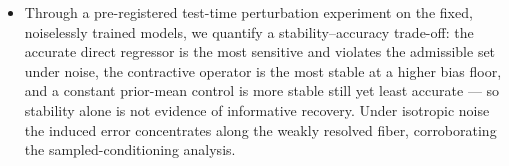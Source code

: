 \begin{itemize}
    \item Through a pre-registered test-time perturbation experiment on the fixed, noiselessly trained models, we quantify a stability--accuracy trade-off: the accurate direct regressor is the most sensitive and violates the admissible set under noise, the contractive operator is the most stable at a higher bias floor, and a constant prior-mean control is more stable still yet least accurate --- so stability alone is not evidence of informative recovery. Under isotropic noise the induced error concentrates along the weakly resolved fiber, corroborating the sampled-conditioning analysis.
\end{itemize}
